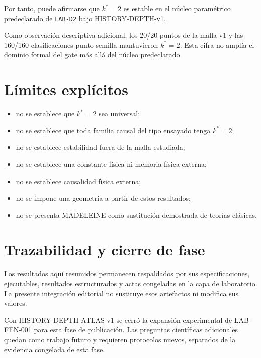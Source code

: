 \begin{observation}
Por tanto, puede afirmarse que \(k^\ast=2\) es estable en el núcleo paramétrico predeclarado de \texttt{LAB-D2} bajo HISTORY-DEPTH-v1.
\end{observation}

\begin{observation}
Como observación descriptiva adicional, los 20/20 puntos de la malla v1 y las 160/160 clasificaciones punto-semilla mantuvieron \(k^\ast=2\). Esta cifra no amplía el dominio formal del gate más allá del núcleo predeclarado.
\end{observation}

\section*{Límites explícitos}

\begin{itemize}
\item no se establece que \(k^\ast=2\) sea universal;
\item no se establece que toda familia causal del tipo ensayado tenga \(k^\ast=2\);
\item no se establece estabilidad fuera de la malla estudiada;
\item no se establece una constante física ni memoria física externa;
\item no se establece causalidad física externa;
\item no se impone una geometría a partir de estos resultados;
\item no se presenta MADELEINE como sustitución demostrada de teorías clásicas.
\end{itemize}

\section*{Trazabilidad y cierre de fase}

\begin{observation}
Los resultados aquí resumidos permanecen respaldados por sus especificaciones, ejecutables, resultados estructurados y actas congeladas en la capa de laboratorio. La presente integración editorial no sustituye esos artefactos ni modifica sus valores.
\end{observation}

\begin{observation}
Con HISTORY-DEPTH-ATLAS-v1 se cerró la expansión experimental de LAB-FEN-001 para esta fase de publicación. Las preguntas científicas adicionales quedan como trabajo futuro y requieren protocolos nuevos, separados de la evidencia congelada de esta fase.
\end{observation}
